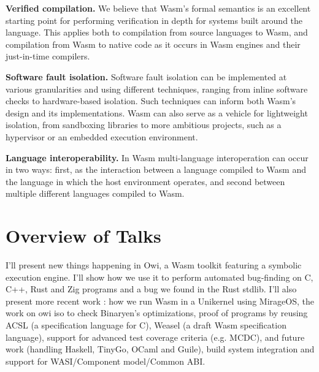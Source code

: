 \documentclass[a4paper,UKenglish]{dagrep-v2018}
\begin{document}
\textbf{Verified compilation.} We believe that Wasm's formal semantics is an excellent starting point for performing verification in depth for systems built around the language. This applies both to compilation from source languages to Wasm, and compilation from Wasm to native code as it occurs in Wasm engines and their just-in-time compilers.

\textbf{Software fault isolation.} Software fault isolation can be implemented at various granularities and using different techniques, ranging from inline software checks to hardware-based isolation. Such techniques can inform both Wasm's design and its implementations. Wasm can also serve as a vehicle for lightweight isolation, from sandboxing libraries to more ambitious projects, such as a hypervisor or an embedded execution environment.

\textbf{Language interoperability.} In Wasm multi-language interoperation can occur in two ways: first, as the interaction between a language compiled to Wasm and the language in which the host environment operates, and second between multiple different languages compiled to Wasm.


\tableofcontents


\section{Overview of Talks}

\license
{}

I’ll present new things happening in Owi, a Wasm toolkit featuring a symbolic execution engine. I’ll show how we use it to perform automated bug-finding on C, C++, Rust and Zig programs and a bug we found in the Rust stdlib. I’ll also present more recent work : how we run Wasm in a Unikernel using MirageOS, the work on owi iso to check Binaryen’s optimizations, proof of programs by reusing ACSL (a specification language for C), Weasel (a draft Wasm specification language), support for advanced test coverage criteria (e.g. MCDC), and future work (handling Haskell, TinyGo, OCaml and Guile), build system integration and support for WASI/Component model/Common ABI.
\end{document}
